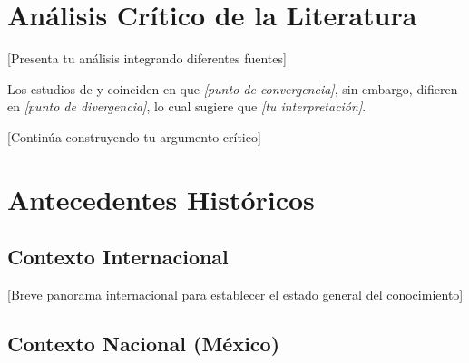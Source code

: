 \section{Análisis Crítico de la Literatura}
\label{sec:analisis_critico}


[Presenta tu análisis integrando diferentes fuentes]

Los estudios de \cite{autor1} y \cite{autor2} coinciden en que \textit{[punto de convergencia]}, sin embargo, difieren en \textit{[punto de divergencia]}, lo cual sugiere que \textit{[tu interpretación]}.

[Continúa construyendo tu argumento crítico]


\section{Antecedentes Históricos}
\label{sec:antecedentes_historicos}


\subsection{Contexto Internacional}
\label{subsec:contexto_internacional}

[Breve panorama internacional para establecer el estado general del conocimiento]

\subsection{Contexto Nacional (México)}
\label{subsec:contexto_nacional}

